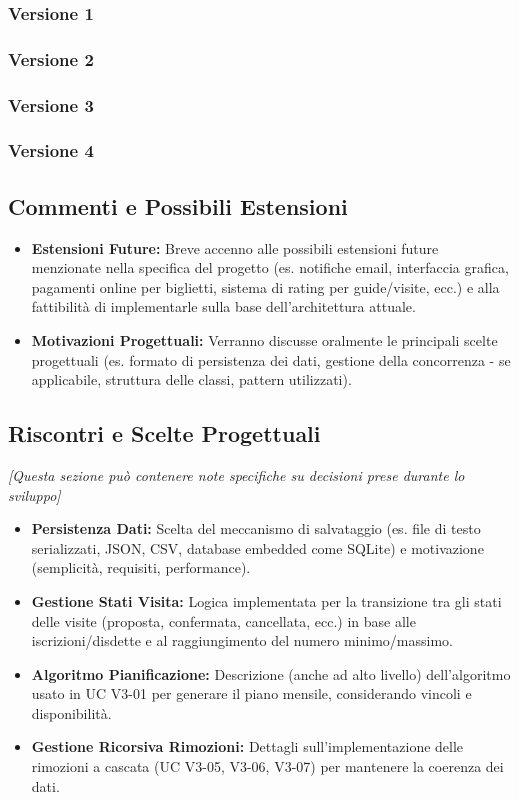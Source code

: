 \documentclass[a4paper,12pt]{article}
\begin{document}
\subsubsection{Versione 1}
\subsubsection{Versione 2}
\subsubsection{Versione 3}
\subsubsection{Versione 4}


\subsection{Commenti e Possibili Estensioni}
\begin{itemize}
    \item \textbf{Estensioni Future:} Breve accenno alle possibili estensioni future menzionate nella specifica del progetto (es. notifiche email, interfaccia grafica, pagamenti online per biglietti, sistema di rating per guide/visite, ecc.) e alla fattibilità di implementarle sulla base dell'architettura attuale.
    \item \textbf{Motivazioni Progettuali:} Verranno discusse oralmente le principali scelte progettuali (es. formato di persistenza dei dati, gestione della concorrenza - se applicabile, struttura delle classi, pattern utilizzati).
\end{itemize}

\subsection{Riscontri e Scelte Progettuali}
\textit{[Questa sezione può contenere note specifiche su decisioni prese durante lo sviluppo]}
\begin{itemize}
    \item \textbf{Persistenza Dati:} Scelta del meccanismo di salvataggio (es. file di testo serializzati, JSON, CSV, database embedded come SQLite) e motivazione (semplicità, requisiti, performance).
    \item \textbf{Gestione Stati Visita:} Logica implementata per la transizione tra gli stati delle visite (proposta, confermata, cancellata, ecc.) in base alle iscrizioni/disdette e al raggiungimento del numero minimo/massimo.
    \item \textbf{Algoritmo Pianificazione:} Descrizione (anche ad alto livello) dell'algoritmo usato in UC V3-01 per generare il piano mensile, considerando vincoli e disponibilità.
    \item \textbf{Gestione Ricorsiva Rimozioni:} Dettagli sull'implementazione delle rimozioni a cascata (UC V3-05, V3-06, V3-07) per mantenere la coerenza dei dati.
\end{itemize}
\end{document}
